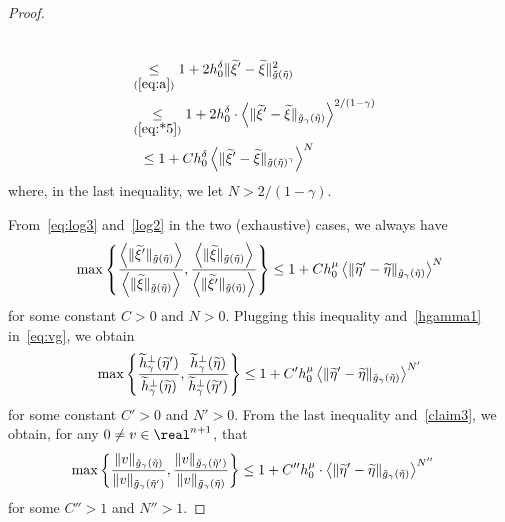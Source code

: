 \documentclass[AHL,Unicode,longabstracts,published]{cedram}
\newcommand*\ineq[1]{\underset{(#1)}{\leq}}
\let\oldtilde\tilde
\renewcommand*{\tilde}[1]{\mathchoice{\widetilde{#1}}{\widetilde{#1}}{\oldtilde{#1}}{\oldtilde{#1}}}
\begin{document}
\begin{proof}
\begin{enumerate}
\begin{equation}
\begin{split}
\\
& \ineq{\ref{eq:a}}1+2h_{0}^{\delta}\|\tilde{\xi}'-\tilde{\xi}\|_{\tilde{g}\left(\tilde{\eta}\right)}^{2}\\
& \ineq{\ref{eq:*5}}1+2h_{0}^{\delta}\cdot\left\langle\|\tilde{\xi}'-\tilde{\xi}\|_{\tilde{g}_{\gamma}\left(\tilde{\eta}\right)}\right\rangle^{2/(1-\gamma)}\\
& \mkern13mu\le1+Ch_{0}^{\delta}\left\langle\|\tilde{\xi}'-\tilde{\xi}\|_{\tilde{g}\left(\tilde{\eta}\right)^{\gamma}}\right\rangle^{N}
\end{split}
\end{equation}
where, in the last inequality, we let $N>2/(1-\gamma)$.
\end{enumerate}
From~\eqref{eq:log3} and~\eqref{log2} in the two (exhaustive) cases, we always have
\[
\max\left\{ \frac{\left\langle\|\tilde{\xi}'\|_{\tilde{g}\left(\tilde{\eta}\right)}\right\rangle}{\left\langle\|\tilde{\xi}\|_{\tilde{g}\left(\tilde{\eta}\right)}\right\rangle},\frac{\left\langle\|\tilde{\xi}\|_{\tilde{g}\left(\tilde{\eta}\right)}\right\rangle}{\left\langle\|\tilde{\xi}'\|_{\tilde{g}\left(\tilde{\eta}\right)}\right\rangle}\right\} \le1+Ch_{0}^{\mu}\left\langle \|\tilde{\eta}'-\tilde{\eta}\|_{\tilde{g}_{\gamma}\left(\tilde{\eta}\right)}\right\rangle ^{N}
\]
for some constant $C>0$ and $N>0$. Plugging this inequality and~\eqref{hgamma1} in~\eqref{eq:vg}, we obtain
\[
\max\left\{ \frac{\tilde{h}_{\gamma}^{\perp}(\tilde{\eta}')}{\tilde{h}_{\gamma}^{\perp}(\tilde{\eta})},\frac{\tilde{h}_{\gamma}^{\perp}(\tilde{\eta})}{\tilde{h}_{\gamma}^{\perp}(\tilde{\eta}')}\right\} \le1+C'h_{0}^{\mu}\left\langle \|\tilde{\eta}'-\tilde{\eta}\|_{\tilde{g}_{\gamma}\left(\tilde{\eta}\right)}\right\rangle ^{N'}
\]
for some constant $C'>0$ and $N'>0$. From the last inequality and~\eqref{claim3}, we obtain, for any $0\neq v\in\real^{n+1}$, that
\begin{align}
\max\left\{ \frac{\|v\|_{\tilde{g}_{\gamma}\left(\tilde{\eta}\right)}}{\|v\|_{\tilde{g}_{\gamma}\left(\tilde{\eta}'\right)}},\frac{\|v\|_{\tilde{g}_{\gamma}\left(\tilde{\eta}'\right)}}{\|v\|_{\tilde{g}_{\gamma}\left(\tilde{\eta}\right)}}\right\} & \le1+C''h_{0}^{\mu}\cdot\left\langle \|\tilde{\eta}'-\tilde{\eta}\|_{\tilde{g}_{\gamma}\left(\tilde{\eta}\right)}\right\rangle ^{N''}\label{claim4}
\end{align}
for some $C''>1$ and $N''>1$.


\end{proof}
\end{document}
